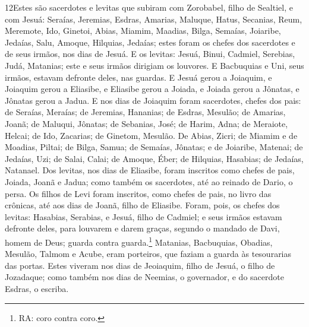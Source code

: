 \lettrine{12} Estes são sacerdotes e levitas que subiram com
Zorobabel, filho de Sealtiel, e com Jesuá: Seraías, Jeremias,
Esdras, Amarias, Maluque, Hatus, Secanias, Reum, Meremote,
Ido, Ginetoi, Abias, Miamim, Maadias, Bilga, Semaías,
Joiaribe, Jedaías, Salu, Amoque, Hilquias, Jedaías; estes foram
os chefes dos sacerdotes e de seus irmãos, nos dias de Jesuá. E
os levitas: Jesuá, Binui, Cadmiel, Serebias, Judá, Matanias; este e
seus irmãos dirigiam os louvores. E Bacbuquias e Uni, seus
irmãos, estavam defronte deles, nas guardas. E Jesuá gerou a
Joiaquim, e Joiaquim gerou a Eliasibe, e Eliasibe gerou a Joiada,
e Joiada gerou a Jônatas, e Jônatas gerou a Jadua. E
nos dias de Joiaquim foram sacerdotes, chefes dos pais: de Seraías,
Meraías; de Jeremias, Hananias; de Esdras, Mesulão; de
Amarias, Joanã; de Maluqui, Jônatas; de Sebanias, José;
de Harim, Adna; de Meraiote, Helcai; de Ido, Zacarias;
de Ginetom, Mesulão. De Abias, Zicri; de Miamim e de Moadias,
Piltai; de Bilga, Samua; de Semaías, Jônatas; e de
Joiaribe, Matenai; de Jedaías, Uzi; de Salai, Calai; de
Amoque, Éber; de Hilquias, Hasabias; de Jedaías, Natanael.
Dos levitas, nos dias de Eliasibe, foram inscritos como
chefes de pais, Joiada, Joanã e Jadua; como também os sacerdotes,
até ao reinado de Dario, o persa. Os filhos de Levi foram
inscritos, como chefes de pais, no livro das crônicas, até aos dias
de Joanã, filho de Eliasibe. Foram, pois, os chefes dos
levitas: Hasabias, Serabias, e Jesuá, filho de Cadmiel; e seus
irmãos estavam defronte deles, para louvarem e darem graças, segundo
o mandado de Davi, homem de Deus; guarda contra guarda.\footnote{RA:
coro contra coro.} Matanias, Bacbuquias, Obadias, Mesulão,
Talmom e Acube, eram porteiros, que faziam a guarda às tesourarias
das portas. Estes viveram nos dias de Jeoiaquim, filho de
Jesuá, o filho de Jozadaque; como também nos dias de Neemias, o
governador, e do sacerdote Esdras, o escriba.

